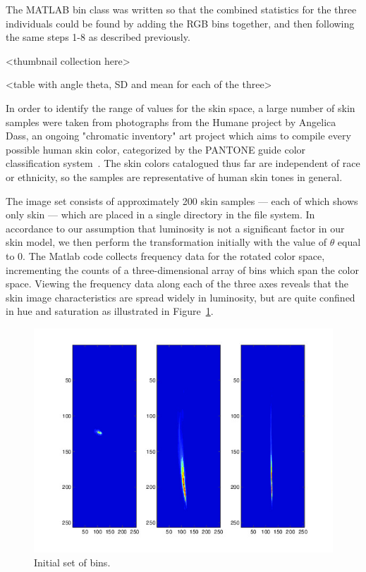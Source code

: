 The MATLAB bin class was written so that the combined statistics for the three individuals could be found by adding the RGB bins together, and then following the same steps 1-8 as described previously.

<thumbnail collection here>

<table with angle theta, SD and mean for each of the three>



In order to identify the range of values for the skin space, a large number of skin samples were taken from photographs from the Humane project by Angelica Dass, an ongoing "chromatic inventory" art project which aims to compile every possible human skin color, categorized by the PANTONE guide color classification system~\cite{Dass2012}. The skin colors catalogued thus far are independent of race or ethnicity, so the samples are representative of human skin tones in general.

The image set consists of approximately 200 skin samples --- each of which shows only skin --- which are placed in a single directory in the file system. In accordance to our assumption that luminosity is not a significant factor in our skin model, we then perform the transformation initially with the value of $\theta$ equal to 0. The Matlab code collects frequency data for the rotated color space, incrementing the counts of a three-dimensional array of bins which span the color space. Viewing the frequency data along each of the three axes reveals that the skin image characteristics are spread widely in luminosity, but are quite confined in hue and saturation as illustrated in Figure~\ref{fig:InitBins}.


\begin{figure}[h!]
  \centering
    \includegraphics[width=\textwidth]{Chapter3/Figs/InitialBins.jpg}
    \caption{Initial set of bins.}  \label{fig:InitBins}
\end{figure}


